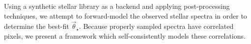 \documentclass[iop,floatfix]{emulateapj}
\newcommand{\vt}{\vec{\theta}}
\newcommand{\vg}{\vt_{\star, {\rm grid}}}
\newcommand{\vpp}{\vt_{\star, {\rm post}}}
\newcommand{\vstar}{\vt_{\star}}
\newcommand{\finst}{f_{\lambda, {\rm inst}}}
\newcommand{\fsynth}{f_{\lambda, {\rm synth}}}
\newcommand{\vN}{\vt_{\rm N}}
\newcommand{\fM}{ {\bm M}}
\newcommand{\fMi}{M_i}
\newcommand{\fD}{ {\bm D}}
\newcommand{\fDi}{D_i}
\newcommand{\fR}{ {\bm R}}
\newcommand{\Z}{[{\rm Fe}/{\rm H}]}
\newcommand{\A}{[\alpha/{\rm Fe}]}
\begin{document}
Using a synthetic stellar library as a backend and applying post-processing
 techniques, we attempt to forward-model the observed stellar spectra in order
 to determine the best-fit $\vstar$. 
Because properly sampled spectra have correlated pixels, we present a framework
 which self-consistently models these correlations. 

\end{document}
